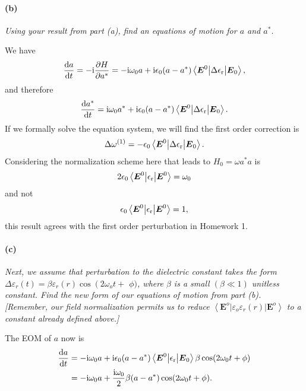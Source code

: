 \documentclass[hyperref, a4paper]{article}
\newcommand*{\ii}{\mathrm{i}}
\newcommand{\epsr}{\epsilon_{\text{r}}}
\begin{document}
\paragraph*{(b)} \textit{Using your result from part (a), find an equations of motion for $a$ and $a^*$.} 

We have 
\begin{equation}
    \dv{a}{t} = - \ii \pdv{H}{a^*} 
    = - \ii \omega_0 a + \ii \epsilon_0 (a - a^*) \mel**{\vb*{E}^0}{\Delta \epsr}{\vb*{E}_0},
\end{equation}
and therefore 
\begin{equation}
    \dv{a^*}{t} = \ii \omega_0 a^* + \ii \epsilon_0 (a - a^*) \mel**{\vb*{E}^0}{\Delta \epsr}{\vb*{E}_0}.
\end{equation}
If we formally solve the equation system, we will find the first order correction is 
\begin{equation}
    \Delta \omega^{(1)} = - \epsilon_0 \mel**{\vb*{E}^0}{\Delta \epsr}{\vb*{E}_0}.
\end{equation}
Considering the normalization scheme here that leads to $H_0 = \omega a^* a$ is 
\begin{equation}
    2 \epsilon_0 \mel**{\vb*{E}^0}{\epsr}{\vb*{E}^0} = \omega_0
    \label{eq:normalization-e}
\end{equation}
and not 
\begin{equation}
    \epsilon_0 \mel**{\vb*{E}^0}{\epsr}{\vb*{E}^0} = 1,
\end{equation}
this result agrees with the first order perturbation in Homework 1. 

\paragraph*{(c)} \textit{Next, we assume that perturbation to the dielectric constant takes the form $\Delta \varepsilon_r(t)=\beta \varepsilon_r(r) \cos \left(2 \omega_o t+\right.$ $\phi)$, where $\beta$ is a small $(\beta \ll 1)$ unitless constant. Find the new form of our equations of motion from part (b). [Remember, our field normalization permits us to reduce $\left\langle\mathbf{E}^o\left|\varepsilon_o \varepsilon_r(r)\right| \mathbf{E}^o\right\rangle$ to a constant already defined above.]} 

The EOM of $a$ now is 
\begin{equation}
    \begin{aligned}
        \dv{a}{t} &= - \ii \omega_0 a + \ii \epsilon_0 (a - a^*) \mel**{\vb*{E}^0}{\epsr}{\vb*{E}_0} \beta \cos (2 \omega_0 t + \phi) \\
        &= - \ii \omega_0 a + \frac{\ii \omega_0}{2} \beta (a - a^*) \cos (2 \omega_0 t + \phi).
    \end{aligned}
\end{equation}
\end{document}

